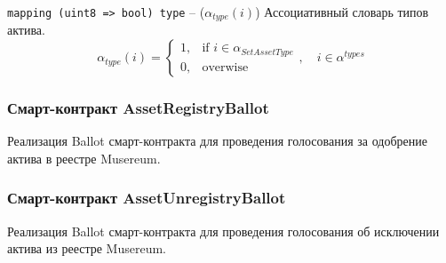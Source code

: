 \documentclass[12pt]{report}
\def\code#1{\colorbox{light-gray}{\texttt{#1}}}
\begin{document}
\code{mapping (uint8 => bool) type} – ($\alpha_{type}(i)$)\hfill\null\linebreak
Ассоциативный словарь типов актива.
\begin{equation}
\alpha_{type}(i) = \begin{cases}
1, & \text{if } i \in \alpha_{SetAssetType} \\
0, & \text{overwise}
\end{cases}, \quad i \in \alpha^{types}
\end{equation}

\subsubsection{Смарт-контракт AssetRegistryBallot}
\label{tech-apps-assets-regballot}
Реализация Ballot смарт-контракта для проведения голосования за одобрение актива в реестре Musereum.
\subsubsection{Смарт-контракт AssetUnregistryBallot}
\label{tech-apps-assets-unregballot}
Реализация Ballot смарт-контракта для проведения голосования об исключении актива из реестре Musereum.
\end{document}
